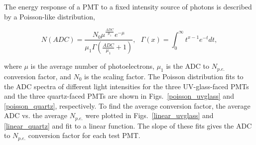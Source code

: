 The energy response of a PMT to a fixed intensity source of photons
is described by a Poisson-like distribution, 

\begin{equation}
N(ADC) = \frac{N_{0}\mu^{\frac{ADC}{\mu_1}}e^{-\mu}}{\mu_{1}
\Gamma(\frac{ADC}{\mu_1}+1)},\textrm{ }\Gamma(x)=\int_0^\infty t^{x-1}e^{-t}dt,
\end{equation}

\noindent
where $\mu$ is the average number of photoelectrons, $\mu_1$ is
the ADC to $N_{p.e.}$ conversion factor, and $N_0$ is the scaling factor.
The Poisson distribution fits to the ADC spectra of different light
intensities for the three UV-glass-faced PMTs and the three quartz-faced
PMTs are shown in Figs.~\ref{poisson_uvglass} and \ref{poisson_quartz},
respectively. To find the average conversion factor, the average ADC
vs. the average $N_{p.e.}$ were plotted in Figs.~\ref{linear_uvglass}
and \ref{linear_quartz} and fit to a linear function.  The slope
of these fits gives the ADC to $N_{p.e.}$ conversion factor for each 
test PMT. 

